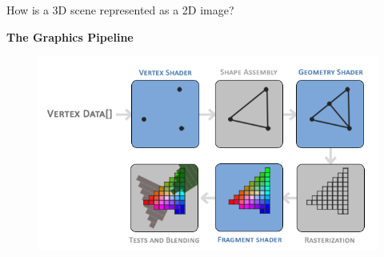 \documentclass[10pt]{beamer}
\begin{document}


\begin{frame}{How is a 3D scene represented as a 2D image?}
  \begin{center}
    \huge\textbf{The Graphics Pipeline}
  \end{center}
  \begin{figure}
    \includegraphics[width=\textwidth]{learnopengl_graphicspipeline.png}
  \end{figure}
\end{frame}


\end{document}
